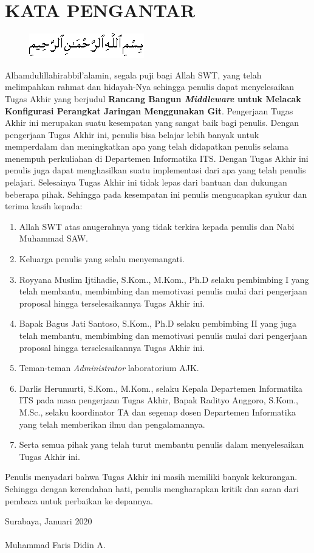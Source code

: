 \chapter{KATA PENGANTAR}
		\begin{figure}[h]
			\centering
			\includegraphics[width=0.5\linewidth]{img/bismillah.png}
		\end{figure}

		Alhamdulillahirabbil’alamin, segala puji bagi Allah SWT, yang telah melimpahkan rahmat dan hidayah-Nya sehingga penulis dapat menyelesaikan Tugas Akhir yang berjudul \textbf{Rancang Bangun \textit{Middleware} untuk Melacak Konfigurasi Perangkat Jaringan Menggunakan Git}. Pengerjaan Tugas Akhir ini merupakan suatu kesempatan yang sangat baik bagi penulis. Dengan pengerjaan Tugas Akhir ini, penulis bisa belajar lebih banyak untuk memperdalam dan meningkatkan apa yang telah didapatkan penulis selama menempuh perkuliahan di Departemen Informatika ITS. Dengan Tugas Akhir ini penulis juga dapat menghasilkan suatu implementasi dari apa yang telah penulis pelajari.
		Selesainya Tugas Akhir ini tidak lepas dari bantuan dan dukungan beberapa pihak. Sehingga pada kesempatan ini penulis mengucapkan syukur dan terima kasih kepada:
		\begin{enumerate}
			\item Allah SWT atas anugerahnya yang tidak terkira kepada penulis dan Nabi Muhammad SAW.
            \item Keluarga penulis yang selalu menyemangati.
			\item Royyana Muslim Ijtihadie, S.Kom., M.Kom.,   Ph.D selaku pembimbing I yang telah membantu, membimbing dan memotivasi penulis mulai dari pengerjaan proposal hingga terselesaikannya Tugas Akhir ini.
			\item Bapak Bagus Jati Santoso, S.Kom., Ph.D selaku pembimbing II yang juga telah membantu, membimbing dan memotivasi penulis mulai dari pengerjaan proposal hingga terselesaikannya Tugas Akhir ini.
            \item Teman-teman \textit{Administrator} laboratorium AJK.
			\item Darlis Herumurti, S.Kom., M.Kom., selaku Kepala Departemen Informatika ITS pada masa pengerjaan Tugas Akhir, Bapak Radityo Anggoro, S.Kom., M.Sc., selaku koordinator TA dan segenap dosen Departemen Informatika yang telah memberikan ilmu dan pengalamannya.
			\item Serta semua pihak yang telah turut membantu penulis dalam menyelesaikan Tugas Akhir ini.
		\end{enumerate}

		Penulis menyadari bahwa Tugas Akhir ini masih memiliki banyak kekurangan. Sehingga dengan kerendahan hati, penulis mengharapkan kritik dan saran dari pembaca untuk perbaikan ke depannya.

	\hfill Surabaya, Januari 2020 \\ \\ 


  \hfill Muhammad Faris Didin A.